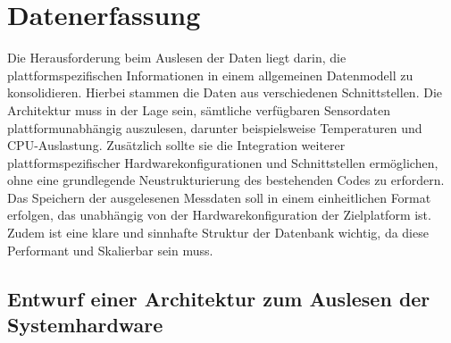 \section{Datenerfassung}\label{sec:Datenerfassung}
Die Herausforderung beim Auslesen der Daten liegt darin, die plattformspezifischen Informationen in einem allgemeinen Datenmodell zu konsolidieren. Hierbei stammen die Daten aus verschiedenen Schnittstellen. Die Architektur muss in der Lage sein, sämtliche verfügbaren Sensordaten plattformunabhängig auszulesen, darunter beispielsweise Temperaturen und CPU-Auslastung. Zusätzlich sollte sie die Integration weiterer plattformspezifischer Hardwarekonfigurationen und Schnittstellen ermöglichen, ohne eine grundlegende Neustrukturierung des bestehenden Codes zu erfordern.\\
Das Speichern der ausgelesenen Messdaten soll in einem einheitlichen Format erfolgen, das unabhängig von der Hardwarekonfiguration der Zielplatform ist. Zudem ist eine klare und sinnhafte Struktur der Datenbank wichtig, da diese Performant und Skalierbar sein muss.   

\subsection{Entwurf einer Architektur zum Auslesen der Systemhardware}\label{sec:AuslesenHardware}
 
